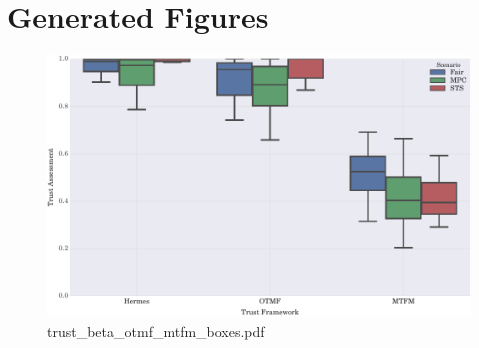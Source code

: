 \documentclass{article}
\begin{document}
\section{Generated Figures}


\begin{figure}[h!]
\centering
\includegraphics[width=\linewidth]{trust_beta_otmf_mtfm_boxes.pdf}
\caption{trust\_beta\_otmf\_mtfm\_boxes.pdf}
\end{figure}
\end{document}
